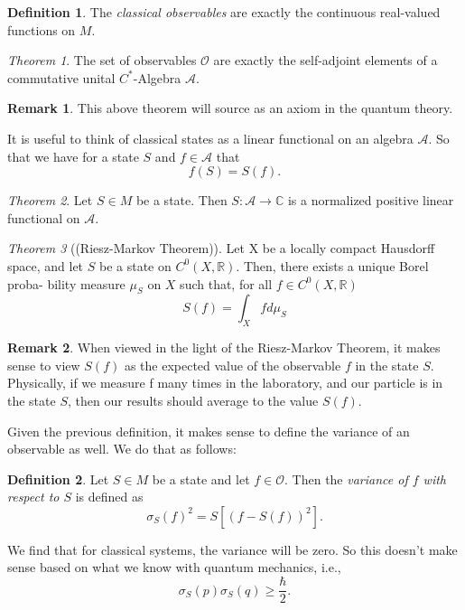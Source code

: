 \documentclass[leqno]{article}
\theoremstyle{definition}
\newtheorem{definition}{Definition}[section]
\newtheorem*{remark}{Remark}
\theoremstyle{remark}
\theoremstyle{theorem}
\newtheorem{theorem}{Theorem}[section]
\newcommand{\R}{\mathbb{R}}
\begin{document}
\begin{definition}
The \emph{classical observables} are exactly the continuous real-valued functions on $M$.
\end{definition}

\begin{theorem}
The set of observables $\mathcal{O}$ are exactly the self-adjoint elements of a commutative unital $C^*$-Algebra $\mathcal{A}$.
\end{theorem}

\begin{remark}
This above theorem will source as an axiom in the quantum theory.
\end{remark}

It is useful to think of classical states as a linear functional on an algebra $\mathcal{A}$.  So that we have for a state $S$ and $f\in \mathcal{A}$ that
\[
f(S)=S(f).
\]

\begin{theorem}
Let $S\in M$ be a state.  Then $S\colon \mathcal{A} \to \mathbb{C}$ is a normalized positive linear functional on $\mathcal{A}$.
\end{theorem}

\begin{theorem}[(Riesz-Markov Theorem)] Let X be a locally compact Hausdorff
space, and let $S$ be a state on $C^0 (X, \R)$. Then, there exists a unique Borel proba-
bility measure $\mu_S$ on $X$ such that, for all $f \in C^0 (X, \R)$
\[
S(f)=\int_X f d\mu_S
\]
\end{theorem}

\begin{remark}
When viewed in the light of the Riesz-Markov Theorem, it makes sense to view
$S(f )$ as the expected value of the observable $f$ in the state $S$. Physically, if we
measure f many times in the laboratory, and our particle is in the state $S$, then
our results should average to the value $S(f )$. 
\end{remark}

Given the previous definition, it makes sense to define the variance of an observable as well. We do that as follows:

\begin{definition}
Let $S\in M$ be a state and let $f \in \mathcal{O}$.  Then the \emph{variance of $f$ with respect to $S$} is defined as
\[
\sigma_S (f)^2 = S\left[ (f-S(f))^2 \right].
\]
\end{definition}

We find that for classical systems, the variance will be zero.  So this doesn't make sense based on what we know with quantum mechanics, i.e., 
\[
\sigma_S(p)\sigma_S(q)\geq \frac{\hbar}{2}.
\]
\end{document}
